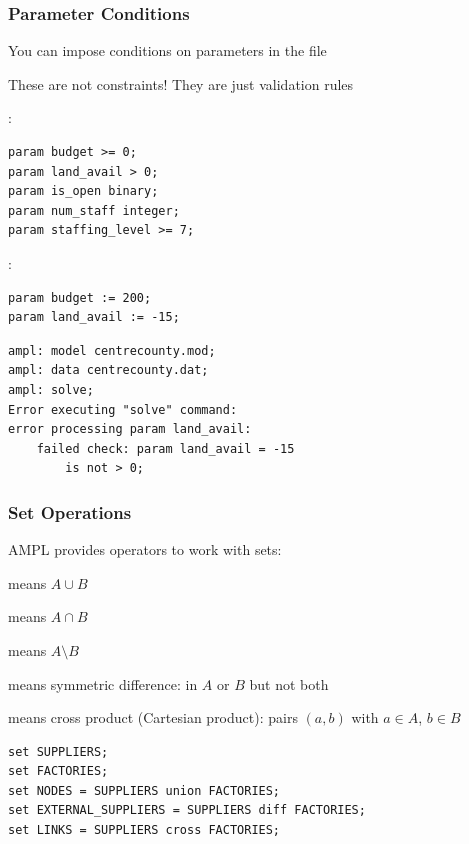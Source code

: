 \begin{frame}[fragile]

	\frametitle{Parameter Conditions}
	
	\bit
	\item You can impose conditions on parameters in the  file
	\item These are not constraints! They are just validation rules
	\eit

:	
\begin{lstlisting}
param budget >= 0;
param land_avail > 0;
param is_open binary;
param num_staff integer;
param staffing_level >= 7;
\end{lstlisting}

:	
\begin{lstlisting}
param budget := 200;
param land_avail := -15;
\end{lstlisting}

\begin{lstlisting}
ampl: model centrecounty.mod;
ampl: data centrecounty.dat;
ampl: solve;
Error executing "solve" command:
error processing param land_avail:
	failed check: param land_avail = -15
		is not > 0;
\end{lstlisting}

\end{frame}

\begin{frame}[fragile]

	\frametitle{Set Operations}
	
	\bit
	\item AMPL provides operators to work with sets:
		\bit
		\item {} means $A \cup B$
		\item {} means $A \cap B$
		\item {} means $A \setminus B$
		\item {} means symmetric difference: in $A$ or $B$ but not both
		\item {} means cross product (Cartesian product): pairs $(a,b)$ with $a\in A$, $b\in B$
		\eit
	\eit

\begin{lstlisting}
set SUPPLIERS;
set FACTORIES;
set NODES = SUPPLIERS union FACTORIES;
set EXTERNAL_SUPPLIERS = SUPPLIERS diff FACTORIES;
set LINKS = SUPPLIERS cross FACTORIES;
\end{lstlisting}

\end{frame}

